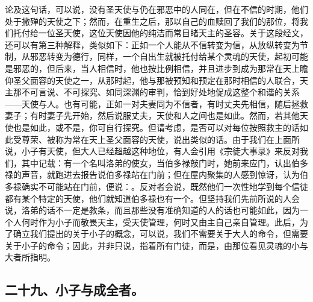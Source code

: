 论及这句话，可以说，没有圣天使与仍在邪恶中的人同在，但在不信的时期，他们处于撒殚的天使之下；然而，在重生之后，那以自己的血赎回了我们的那位，将我们托付给一位圣天使，这位天使因他的纯洁而常目睹天主的圣容。关于这段经文，还可以有第三种解释，类似如下：正如一个人能从不信转变为信，从放纵转变为节制，从邪恶转变为德行，同样，一个自出生就被托付给某个灵魂的天使，起初可能是邪恶的，但后来，当人相信时，他也按比例相信，并且进步到成为那常在天上瞻仰圣父面容的天使之一，从那时起，他与那被预知和预定在那时相信的人联合，天主那不可言说、不可探究、如同深渊的审判，恰到好处地促成这整个和谐的关系——天使与人。也有可能，正如一对夫妻同为不信者，有时丈夫先相信，随后拯救妻子；有时妻子先开始，然后说服丈夫，天使和人之间也是如此。然而，若其他天使也是如此，或不是，你可自行探究。但请考虑，是否可以对每位按照救主的话如此受尊荣、被称为常在天上圣父面容的天使，说出类似的话。由于我们在上面所说，小子有天使，但大人已经超越这种地位，有人会引用《宗徒大事录》来反对我们，其中记载：有一个名叫洛弟的使女，当伯多禄敲门时，她前来应门，认出伯多禄的声音，就跑进去报告说伯多禄站在门前；但在屋内聚集的人感到惊讶，认为伯多禄确实不可能站在门前，便说：。反对者会说，既然他们一次性地学到每个信徒都有某个特定的天使，他们就知道伯多禄也有一个。但坚持我们先前所说的人会说，洛弟的话不一定是教条，而且那些没有准确知道的人的话也可能如此，因为一个人何时作为小子而敬畏天主，受天使管理，何时又由主自己亲自管理。此后，为了确立我们提出的关于小子的概念，可以说，我们不需要关于大人的命令，但需要关于小子的命令；因此，并非只说，指着所有门徒，而是，由那位看见灵魂的小与大者所指明。\par


\subsection{二十九、小子与成全者。}

